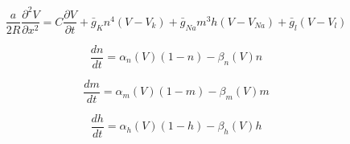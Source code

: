 \documentclass{article}
\begin{document}
\[\frac{a}{2R}\frac{\partial^2V}{\partial x^2}=C\frac{\partial V}{\partial t}+\bar{g}_{K}n^4(V-V_k)+\bar{g}_{Na}m^3h(V-V_{Na})+\bar{g}_l(V-V_l)\]
\pagebreak

\[\frac{dn}{dt}=\alpha_n(V)(1-n)-\beta_n(V)n\]
\pagebreak

\[\frac{dm}{dt}=\alpha_m(V)(1-m)-\beta_m(V)m\]
\pagebreak

\[\frac{dh}{dt}=\alpha_h(V)(1-h)-\beta_h(V)h\]
\pagebreak
\end{document}
